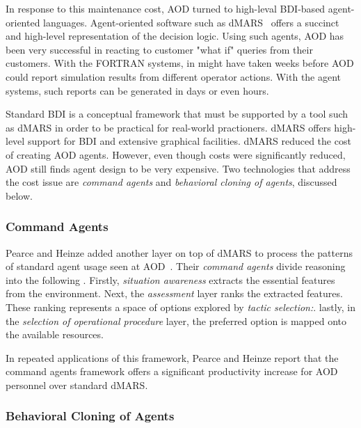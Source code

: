 In response to this maintenance cost, AOD turned to high-leval
BDI-based agent-oriented languages. Agent-oriented software such
as dMARS~\cite{dinv98} offers a succinct and high-level
representation of the decision logic. Using such agents, AOD has
been very successful in reacting to customer "what if" queries
from their customers. With the FORTRAN systems, in might have
taken weeks before AOD could report simulation results from
different operator actions. With the agent systems, such reports
can be generated in days or even hours.

Standard BDI is a conceptual framework that must be supported by a tool such as
dMARS in order to be practical for real-world practioners.  dMARS offers
high-level  support for BDI and extensive graphical facilities. dMARS reduced
the cost of creating AOD agents. However, even though costs were significantly
reduced, AOD still finds agent design to be very expensive. Two technologies
that address the cost issue are {\em command agents} and {\em behavioral
cloning of agents}, discussed below.

\subsubsection{Command
Agents}\label{sec:ca}

Pearce and Heinze  added another layer on top of dMARS to process the patterns
of standard agent usage seen at AOD~\cite{pearce00,heinze02}. Their {\em
command agents} divide reasoning into the following . Firstly, {\em  situation
awareness} extracts the essential features from the environment. Next, the {\em
 assessment} layer ranks the extracted features. These ranking represents a
 space of options explored by {\em
  tactic selection:}. lastly, in the
{\em selection of operational procedure} layer, the preferred option is mapped
  onto the available resources.


In repeated applications of this framework, Pearce and Heinze
report that the command agents framework offers  a significant
productivity increase for AOD personnel over standard dMARS.

\subsubsection{Behavioral Cloning of
Agents}\label{sec:clone}

